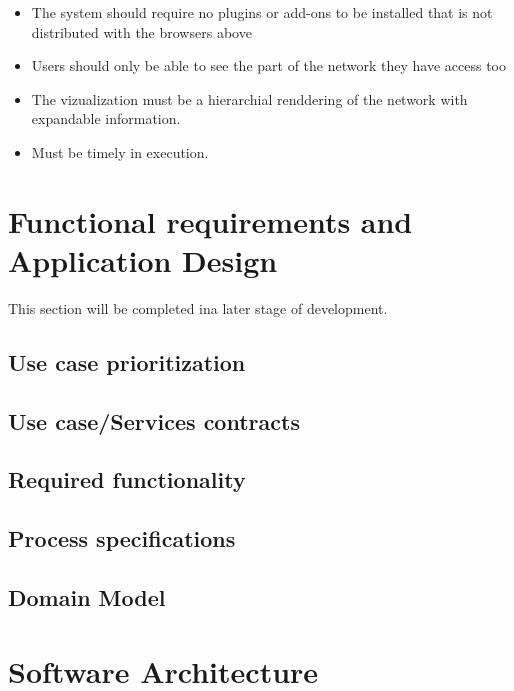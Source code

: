 \documentclass[a4paper,12pt]{report}
\begin{document}
\begin{itemize}
    \item The system should require no plugins or add-ons to be installed that is not distributed with the browsers above

\end{itemize}
\begin{itemize}
    \item Users should only be able to see the part of the network they have access too

\end{itemize}
\begin{itemize}
    \item The vizualization must be a hierarchial renddering of the network with expandable information.

\end{itemize}
\begin{itemize}
    \item Must be timely in execution.
\end{itemize}


\section{Functional requirements and Application Design}
This section will be completed ina later stage of development.
	\subsection{Use case prioritization}
	\subsection{Use case/Services contracts}
	\subsection{Required functionality}
	\subsection{Process specifications}
	\subsection{Domain Model}

\section{Software Architecture}
\end{document}
